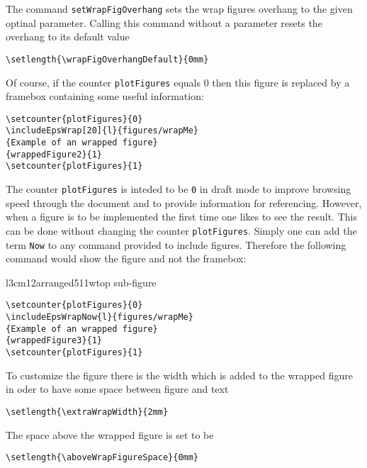 \documentclass[12pt,a4paper]{article}
\newcommand{\comm}[1]{\texttt{#1}}
\begin{document}
The command \verb+setWrapFigOverhang+ sets the wrap figures overhang to the given optinal 
parameter. Calling this command without a parameter resets the overhang to its default value

\begin{verbatim} 
\setlength{\wrapFigOverhangDefault}{0mm}
\end{verbatim}

Of course, if the counter \comm{plotFigures} equals 0 then this figure is 
replaced by a framebox containing some useful information:

\begin{verbatim}
\setcounter{plotFigures}{0}
\includeEpsWrap[20]{l}{figures/wrapMe}
{Example of an wrapped figure}
{wrappedFigure2}{1}
\setcounter{plotFigures}{1}
\end{verbatim}

The counter \comm{plotFigures} is inteded to be \comm{0} in 
draft mode to improve browsing speed through the document and
to provide information for referencing. However, when a figure 
is to be implemented the first time one likes to see the result. 
This can be done without changing the counter \comm{plotFigures}.
Simply one can add the term \comm{Now} to any command provided 
to include figures. Therefore the following command would show the 
figure and not the framebox:
%
\begin{arrangedWrapFigure}[15]{l}{3cm}{1}{2}{arranged511w}{top sub-figure}
\end{arrangedWrapFigure}

\begin{verbatim}
\setcounter{plotFigures}{0}
\includeEpsWrapNow{l}{figures/wrapMe}
{Example of an wrapped figure}
{wrappedFigure3}{1}
\setcounter{plotFigures}{1}
\end{verbatim}

To customize the figure there is the width which is added to the wrapped figure
in oder to have some space between figure and text

\begin{verbatim}
\setlength{\extraWrapWidth}{2mm}
\end{verbatim}

The space above the wrapped figure is set to be

\begin{verbatim}
\setlength{\aboveWrapFigureSpace}{0mm}
\end{verbatim}
\end{document}
